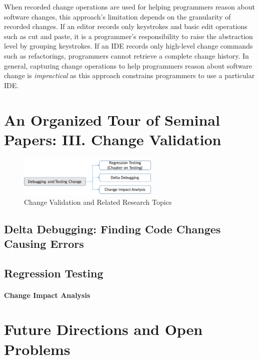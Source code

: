 \documentclass[runningheads,a4paper]{llncs}
\begin{document}
When recorded change operations are used for helping programmers reason about software changes, this approach's limitation depends on the granularity of recorded changes. If an editor records only keystrokes and basic edit operations such as cut and paste, it is a programmer's responsibility to raise the abstraction level by grouping keystrokes. If an IDE records only high-level change commands such as refactorings, programmers cannot retrieve a complete change history. 
In general, capturing change operations to help programmers reason about software change is {\it impractical} as this approach constrains programmers to use a particular IDE. 


\section{An Organized Tour of Seminal Papers: III. Change Validation} 
\label{sec:debugtest}

\begin{figure}[ht]
 \centering
 \includegraphics[width=0.6\textwidth]{images/ChangeValidation.pdf} 
 \caption{Change Validation and Related Research Topics} 
 \label{fig:changevalidation} 
\end{figure}



\subsection{Delta Debugging: Finding Code Changes Causing Errors}
\subsection{Regression Testing} 
\paragraph{Change Impact Analysis} 

\section{Future Directions and Open Problems} 
\end{document}
